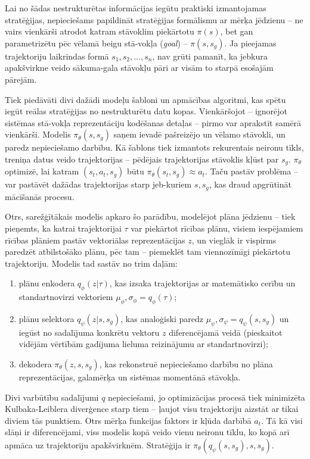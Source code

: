 \documentclass[12pt, a4paper]{article}
\numberwithin{equation}{section} %
\begin{document}
Lai no šādas nestrukturētas informācijas iegūtu praktiski izmantojamas stratēģijas, nepieciešams papildināt stratēģijas formālismu ar mērķa jēdzienu -- ne vairs vienkārši atrodot katram stāvoklim piekārtotu $\pi(s)$, bet gan parametrizētu pēc vēlamā beigu stā-vokļa (\textit{goal}) -- $\pi(s,s_{g})$. Ja pieejamas trajektoriju laikrindas formā $s_1, s_2, ..., s_n$, nav grūti pamanīt, ka jebkura apakšvirkne veido sākuma-gala stāvokļu pāri ar visām to starpā esošajām pārejām.

Tiek piedāvāti divi dažādi modeļu šabloni un apmācības algoritmi, kas spētu iegūt reālas stratēģijas no nestrukturētu datu kopas. Vienkāršojot -- ignorējot sistēmas stā-vokļa reprezentāciju kodēšanas detaļas -- pirmo var aprakstīt samērā vienkārši. Modelis $\pi_{\theta}(s,s_g)$ saņem ievadē pašreizējo un vēlamo stāvokli, un paredz nepieciešamo darbību. Kā šablons tiek izmantots rekurentais neironu tīkls, treniņa datus veido trajektorijas -- pēdējais trajektorijas stāvoklis kļūst par $s_g$. $\pi_{\theta}$ optimizē, lai katram $(s_t, a_t, s_g)$ būtu $\pi_{\theta}(s_t, s_g) \approx a_t$. Taču pastāv problēma -- var pastāvēt dažādas trajektorijas starp jeb-kuriem $s, s_g$, kas draud apgrūtināt mācīšanās procesu.

Otrs, sarežģītākais modelis apkaro šo parādību, modelējot plāna jēdzienu -- tiek pieņemts, ka katrai trajektorijai $\tau$ var piekārtot rīcības plānu, visiem iespējamiem rīcības plāniem pastāv vektoriālas reprezentācijas $z$, un vieglāk ir vispirms paredzēt atbilstošāko plānu, pēc tam -- piemeklēt tam viennozīmīgi piekārtotu trajektoriju. Modelis tad sastāv no trim daļām:

\begin{enumerate}
    \item plānu enkodera $q_{\phi}(z \vert \tau)$, kas izsaka trajektorijas ar matemātisko cerību un standartnovirzi vektoriem $\mu_{\phi}, \sigma_{\phi} = q_{\phi}(\tau)$;
    \item plānu selektora $q_{\psi}(z \vert s, s_g)$, kas analoģiski paredz $\mu_{\psi}, \sigma_{\psi} = q_{\psi}(s, s_g)$ un iegūst no sadalījuma konkrētu vektoru $z$ diferencējamā veidā (pieskaitot vidējām vērtībām gadījuma lieluma reizinājumu ar standartnovirzi);
    \item dekodera $\pi_{\theta}(z, s, s_g)$, kas rekonstruē nepieciešamo darbību no plāna reprezentācijas, galamērķa un sistēmas momentānā stāvokļa.
\end{enumerate}

Divi varbūtību sadalījumi $q$ nepieciešami, jo optimizācijas procesā tiek minimizēta Kulbaka-Leiblera diverģence starp tiem -- ļaujot visu trajektoriju aizstāt ar tikai diviem tās punktiem. Otrs mērķa funkcijas faktors ir kļūda darbībā $a_t$. Tā kā visi slāņi ir diferencējami, viss modelis kopā veido vienu neironu tīklu, ko kopā arī apmāca uz trajektoriju apakšvirknēm. Stratēģija ir $\pi_{\theta}(q_{\psi}(s, s_g), s, s_g)$.
\end{document}
